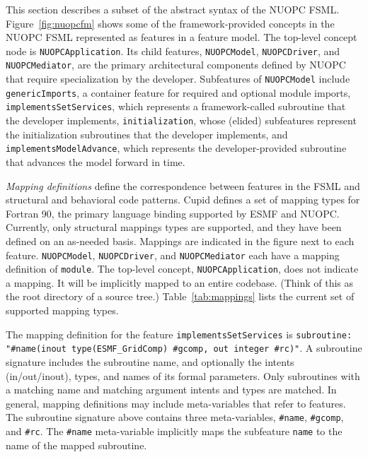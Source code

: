 \documentclass[oneside,11pt]{memoir}
\newcommand{\mapping}[1]{\texttt{\textit{#1}}}
\begin{document}

This section describes a subset of the abstract syntax of the NUOPC FSML. Figure~\ref{fig:nuopcfm} shows some of the framework-provided concepts in the NUOPC FSML represented as features in a feature model. The top-level concept node is \texttt{NUOPCApplication}. Its child features, \texttt{NUOPCModel}, \texttt{NUOPCDriver}, and \texttt{NUOPCMediator}, are the primary architectural components defined by NUOPC that require specialization by the developer. Subfeatures of \texttt{NUOPCModel} include \texttt{genericImports}, a container feature for required and optional module imports, \texttt{implementsSetServices}, which represents a framework-called subroutine that the developer implements, \texttt{initialization}, whose (elided) subfeatures represent the initialization subroutines that the developer implements, and \texttt{implementsModelAdvance}, which represents the developer-provided subroutine that advances the model forward in time.

\emph{Mapping definitions} define the correspondence between features in the FSML and structural and behavioral code patterns. Cupid defines	 a set of mapping types for Fortran 90, the primary language binding supported by ESMF and NUOPC. Currently, only structural mappings types are supported, and they have been defined on an as-needed basis. Mappings are indicated in the figure next to each feature. \texttt{NUOPCModel}, \texttt{NUOPCDriver}, and \texttt{NUOPCMediator} each have a mapping definition of \texttt{module}. The top-level concept, \texttt{NUOPCApplication}, does not indicate a mapping. It will be implicitly mapped to an entire codebase. (Think of this as the root directory of a source tree.) Table~\ref{tab:mappings} lists the current set of supported mapping types.

The mapping definition for the feature \texttt{implementsSetServices} is \texttt{subroutine: "\#name(inout type(ESMF\_GridComp) \#gcomp, out integer \#rc)"}. A subroutine signature includes the subroutine name, and optionally the intents (in/out/inout), types, and names of its formal parameters. Only subroutines with a matching name and matching argument intents and types are matched. In general, mapping definitions may include meta-variables that refer to features. The subroutine signature above contains three meta-variables, \texttt{\#name}, \texttt{\#gcomp}, and \texttt{\#rc}. The \texttt{\#name} meta-variable implicitly maps the subfeature \texttt{name} to the name of the mapped subroutine.
\end{document}
